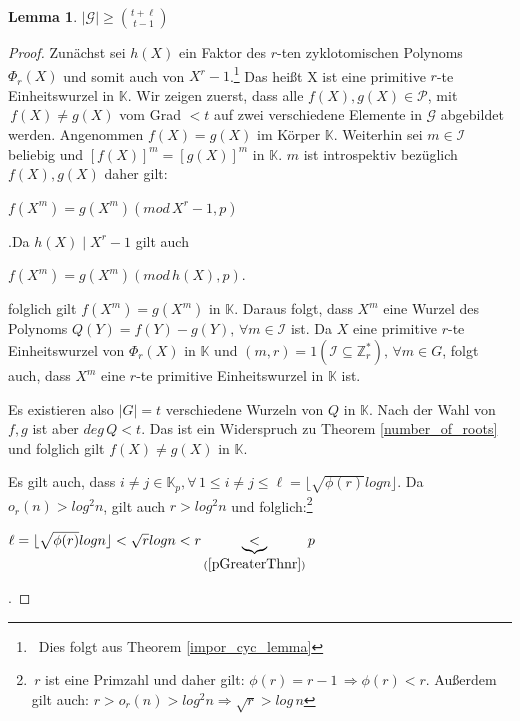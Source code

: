 \documentclass[12pt,oneside]{article}
\newtheorem{lemma}[theorem]{Lemma}
\theoremstyle{remark}
\theoremstyle{definition}
\begin{document}
\begin{lemma}\label{lemma47}
$|\mathcal{G}| \geq {t + \ell \choose t - 1}$
\end{lemma}

\begin{proof}
Zunächst sei $h(X)$ ein Faktor des $r$-ten zyklotomischen Polynoms $\Phi_r (X)$ und somit auch von $X^r - 1$.\footnote{$\,$ Dies folgt aus Theorem \ref{impor_cyc_lemma}} Das heißt X ist eine primitive $r$-te Einheitswurzel in $\mathbb{K}$. Wir zeigen zuerst, dass alle $f(X),g(X) \in \mathcal{P}$, mit $\, f(X) \neq g(X)$ vom Grad $ < t$ auf zwei verschiedene Elemente in $\mathcal{G}$ abgebildet werden.\newline\newline
Angenommen $f(X) = g(X)$ im Körper $\mathbb{K}$. Weiterhin sei $m \in \mathcal{I}$ beliebig und $[f(X)]^m = [g(X)]^m$ in $\mathbb{K}$. $m$ ist introspektiv bezüglich $f(X), g(X)$ daher gilt:\newline\newline
\centerline{$f(X^m) = g(X^m) (mod \, X^r - 1,p)$}.\newline\newline Da $h(X) \mid X^r - 1$ gilt auch\newline\newline
\centerline{$f(X^m) = g(X^m) (mod \, h(X),p)$.}\newline



folglich gilt $f(X^m) = g(X^m)$ in $\mathbb{K}$. Daraus folgt, dass $X^m$ eine Wurzel des Polynoms $Q(Y) = f(Y) - g(Y), \, \forall m \in \mathcal{I}$ ist. Da $X$ eine primitive $r$-te Einheitswurzel von $\Phi_r(X)$ in $\mathbb{K}$ und $(m,r) = 1(\mathcal{I} \subseteq \mathbb{Z}_{r}^*), \, \forall m \in G$, folgt auch, dass $X^m$ eine $r$-te primitive Einheitswurzel in $\mathbb{K}$ ist.

Es existieren also $|G| = t$ verschiedene Wurzeln von $Q$ in $\mathbb{K}$. Nach der Wahl von $f,g$ ist aber $deg \, Q < t$. Das ist ein Widerspruch zu Theorem \ref{number_of_roots} und folglich gilt $f(X) \neq g(X)$ in $\mathbb{K}$.

Es gilt auch, dass $i \neq j  \in \mathbb{K}_p, \forall \, 1 \leq i \neq j \leq \ell = \lfloor \sqrt{\phi(r)} log n \rfloor$. Da $o_r(n) > log^2 n$, gilt auch $r > log^2 n$ und folglich:\footnote{$\, r$ ist eine Primzahl und daher gilt: $\phi(r) = r - 1  \, \Rightarrow \phi(r) < r$. Außerdem gilt auch: $r > o_r(n) > log^2n \Rightarrow \sqrt{r} > log \, n $}\newline\newline
\centerline{$\ell = \lfloor \sqrt{\phi(r)} log n \rfloor < \sqrt{r} log  n < r \underbrace{<}_{(\ref{pGreaterThnr})} p$}.\newline


\end{proof}
\end{document}
